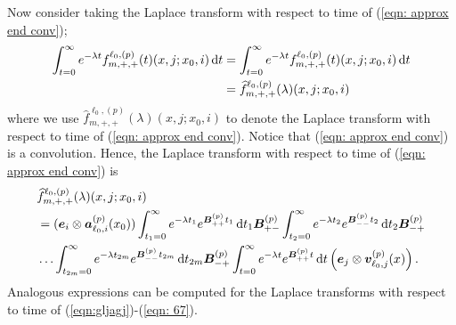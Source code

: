 Now consider taking the Laplace transform with respect to time of (\ref{eqn: approx end conv});
\begin{align}
	\int_{t=0}^\infty e^{-\lambda t} f^{\ell_0,(p)}_{m,+,+}(t)(  x, j; x_0,i) \, \mathrm{d} t \nonumber 
	&= \int_{t=0}^\infty e^{-\lambda t} f^{\ell_0,(p)}_{m,+,+}(t)( x, j; x_0,i)  \, \mathrm{d} t  \nonumber 
	\\&= \widehat f^{\ell_0,(p)}_{m,+,+}(\lambda)( x, j; x_0,i) \label{eqn: fpapPP2}
\end{align}
where we use \(\widehat f^{\ell_0,(p)}_{m,+,+}(\lambda)(  x, j; x_0,i) \) to denote the Laplace transform with respect to time of (\ref{eqn: approx end conv}). Notice that (\ref{eqn: approx end conv}) is a convolution. Hence, the Laplace transform with respect to time of (\ref{eqn: approx end conv}) is
\begin{align}
	&\widehat f^{\ell_0,(p)}_{m,+,+}(\lambda)(x, j; x_0,i) \nonumber 
	\\&=(\boldsymbol e_i\otimes \boldsymbol  a_{\ell_0,i}^{(p)}(x_0))  \int_{t_1=0}^\infty e^{-\lambda t_1} e^{\boldsymbol{B}^{(p)}_{++}t_1} \, \mathrm{d} t_1 \boldsymbol{B}^{(p)}_{+{-}} \nonumber
	\int_{t_2=0}^\infty e^{-\lambda t_2} e^{\boldsymbol{B}^{(p)}_{--}t_2} \, \mathrm{d} t_2\boldsymbol{B}^{(p)}_{-{+}} 
	\\&\hdots 
	\int_{t_{2m}=0}^\infty e^{-\lambda t_{2m}}e^{\boldsymbol{B}^{(p)}_{--}t_{2m}} \, \mathrm{d} t_{2m}\boldsymbol{B}^{(p)}_{-{+}} 
	\int_{t=0}^\infty e^{-\lambda t}e^{\boldsymbol{B}^{(p)}_{++}t} \, \mathrm{d} t 
	\left(\boldsymbol e_j \otimes {\boldsymbol v}_{\ell_0,j}^{(p)}(x)\right). \label{eqn: approx end conv lst}
\end{align}
Analogous expressions can be computed for the Laplace transforms with respect to time of (\ref{eqn:gljagj})-(\ref{eqn: 67}). 

